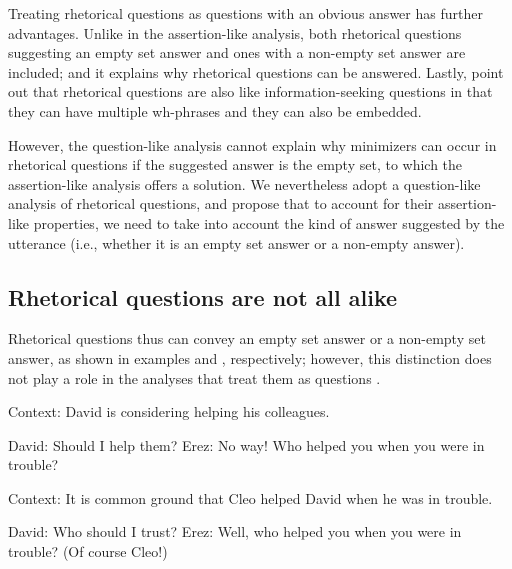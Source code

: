\documentclass[output=paper,colorlinks,citecolor=brown            ,chinesefont]{langscibook}
\begin{document}
Treating rhetorical questions as questions with an obvious answer has further advantages. Unlike in the assertion-like analysis, both rhetorical questions suggesting an empty set answer and ones with a non-empty set answer are included; and it explains why rhetorical questions can be answered. Lastly, \citet{Caponigro+2007} point out that rhetorical questions are also like information-seeking questions in that they can have multiple wh-phrases and they can also be embedded.

However, the question-like analysis cannot explain why minimizers can occur in rhetorical questions if the suggested answer is the empty set, to which the assertion-like analysis offers a solution. We nevertheless adopt a question-like analysis of rhetorical questions, and propose that to account for their assertion-like properties, we need to take into account the kind of answer suggested by the utterance (i.e., whether it is an empty set answer or a non-empty answer). 

\subsection{Rhetorical questions are not all alike}
\label{subsec:alike}

Rhetorical questions thus can convey an empty set answer or a non-empty set answer, as shown in examples  and , respectively; however, this distinction does not play a role in the analyses that treat them as questions \citep{Rohde2006, Caponigro+2007, Biezma+2017}. 

\begin{exe}
\ex\label{empty} Context: David is considering helping his colleagues.
\begin{xlist}
\ex\label{empty1} David: Should I help them? 
\ex\label{empty2} Erez: No way! Who helped you when you were in trouble?
\end{xlist}
\ex\label{nonempty} Context: It is common ground that Cleo helped David when he was in trouble.
\begin{xlist}
\ex\label{nonempty1} David: Who should I trust? 
\ex\label{nonempty2} Erez: Well, who helped you when you were in trouble? (Of course Cleo!)
\end{xlist}
\end{exe}
\end{document}
